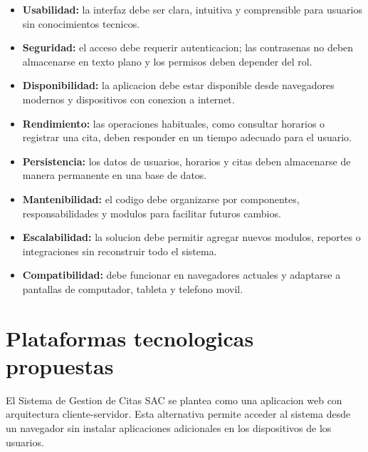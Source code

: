 \documentclass[12pt,letterpaper]{article}
\begin{document}
\begin{itemize}[leftmargin=1.2cm]
    \item \textbf{Usabilidad:} la interfaz debe ser clara, intuitiva y comprensible para usuarios sin conocimientos tecnicos.
    \item \textbf{Seguridad:} el acceso debe requerir autenticacion; las contrasenas no deben almacenarse en texto plano y los permisos deben depender del rol.
    \item \textbf{Disponibilidad:} la aplicacion debe estar disponible desde navegadores modernos y dispositivos con conexion a internet.
    \item \textbf{Rendimiento:} las operaciones habituales, como consultar horarios o registrar una cita, deben responder en un tiempo adecuado para el usuario.
    \item \textbf{Persistencia:} los datos de usuarios, horarios y citas deben almacenarse de manera permanente en una base de datos.
    \item \textbf{Mantenibilidad:} el codigo debe organizarse por componentes, responsabilidades y modulos para facilitar futuros cambios.
    \item \textbf{Escalabilidad:} la solucion debe permitir agregar nuevos modulos, reportes o integraciones sin reconstruir todo el sistema.
    \item \textbf{Compatibilidad:} debe funcionar en navegadores actuales y adaptarse a pantallas de computador, tableta y telefono movil.
\end{itemize}

\section{Plataformas tecnologicas propuestas}

El Sistema de Gestion de Citas SAC se plantea como una aplicacion web con arquitectura cliente-servidor. Esta alternativa permite acceder al sistema desde un navegador sin instalar aplicaciones adicionales en los dispositivos de los usuarios.
\end{document}
